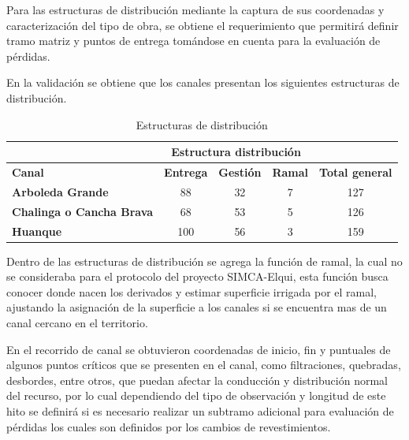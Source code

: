 \documentclass[]{article}
\begin{document}
Para las estructuras de distribución mediante la captura de sus coordenadas y caracterización del tipo de obra, se obtiene el requerimiento que permitirá definir tramo matriz y puntos de entrega tomándose en cuenta para la evaluación de pérdidas. 

En la validación se obtiene que los canales presentan los siguientes estructuras de distribución.

\begin{table}[H]
\centering
\caption{Estructuras de distribución}
\label{my-label}
\begin{tabular}{l|c|c|c|c}
\cline{2-4}
                                                       & \multicolumn{3}{c|}{\textbf{Estructura distribución}} & \multicolumn{1}{l}{}                        \\ \hline
\multicolumn{1}{|l|}{\textbf{Canal}}                   & \textbf{Entrega}  & \textbf{Gestión} & \textbf{Ramal} & \multicolumn{1}{c|}{\textbf{Total general}} \\ \hline
\multicolumn{1}{|l|}{\textbf{Arboleda Grande}}         & 88                & 32               & 7              & \multicolumn{1}{c|}{127}                    \\ \hline
\multicolumn{1}{|l|}{\textbf{Chalinga o Cancha Brava}} & 68                & 53               & 5              & \multicolumn{1}{c|}{126}                    \\ \hline
\multicolumn{1}{|l|}{\textbf{Huanque}}                 & 100               & 56               & 3              & \multicolumn{1}{c|}{159}                    \\ \hline
\end{tabular}
\end{table}

Dentro de las estructuras de distribución se agrega la función de ramal, la cual no se consideraba para el protocolo del proyecto SIMCA-Elqui, esta función busca conocer donde nacen los derivados y estimar superficie irrigada por el ramal, ajustando la asignación de la superficie a los canales si se encuentra mas de un canal cercano en el territorio.

En el recorrido de canal se obtuvieron coordenadas de inicio, fin y puntuales de algunos puntos críticos que se presenten en el canal, como filtraciones, quebradas, desbordes, entre otros, que puedan afectar la conducción y distribución normal del recurso, por lo cual dependiendo del tipo de observación y longitud de este hito se definirá si es necesario realizar un subtramo adicional para evaluación de pérdidas los cuales son definidos por los cambios de revestimientos.
\end{document}
